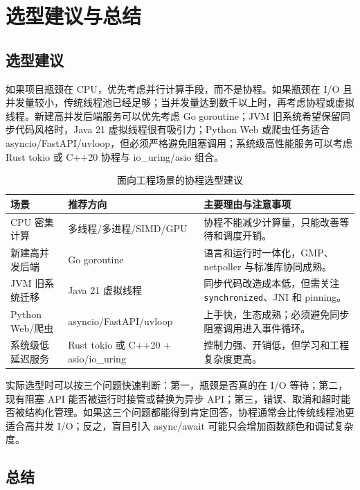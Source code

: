 \documentclass[UTF8,a4paper,12pt]{ctexart}
\begin{document}
\section{选型建议与总结}

\subsection{选型建议}

如果项目瓶颈在 CPU，优先考虑并行计算手段，而不是协程。如果瓶颈在 I/O 且并发量较小，传统线程池已经足够；当并发量达到数千以上时，再考虑协程或虚拟线程。新建高并发后端服务可以优先考虑 Go goroutine；JVM 旧系统希望保留同步代码风格时，Java 21 虚拟线程很有吸引力；Python Web 或爬虫任务适合 asyncio/FastAPI/uvloop，但必须严格避免阻塞调用；系统级高性能服务可以考虑 Rust tokio 或 C++20 协程与 io\_uring/asio 组合。

\begin{table}[H]
  \centering
  \caption{面向工程场景的协程选型建议}
  \begin{tabularx}{\textwidth}{lXX}
    \toprule
    场景 & 推荐方向 & 主要理由与注意事项 \\
    \midrule
    CPU 密集计算 & 多线程/多进程/SIMD/GPU & 协程不能减少计算量，只能改善等待和调度开销。 \\
    新建高并发后端 & Go goroutine & 语言和运行时一体化，GMP、netpoller 与标准库协同成熟。 \\
    JVM 旧系统迁移 & Java 21 虚拟线程 & 同步代码改造成本低，但需关注 \texttt{synchronized}、JNI 和 pinning。 \\
    Python Web/爬虫 & asyncio/FastAPI/uvloop & 上手快，生态成熟；必须避免同步阻塞调用进入事件循环。 \\
    系统级低延迟服务 & Rust tokio 或 C++20 + asio/io\_uring & 控制力强、开销低，但学习和工程复杂度更高。 \\
    \bottomrule
  \end{tabularx}
  \label{tab:selection}
\end{table}

实际选型时可以按三个问题快速判断：第一，瓶颈是否真的在 I/O 等待；第二，现有阻塞 API 能否被运行时接管或替换为异步 API；第三，错误、取消和超时能否被结构化管理。如果这三个问题都能得到肯定回答，协程通常会比传统线程池更适合高并发 I/O；反之，盲目引入 async/await 可能只会增加函数颜色和调试复杂度。

\subsection{总结}
\end{document}
